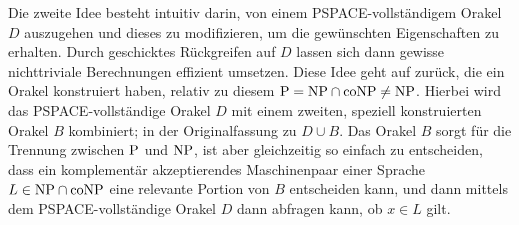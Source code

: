 Die zweite Idee besteht intuitiv darin, von einem PSPACE-vollständigem Orakel $D$ auszugehen und dieses zu modifizieren, um die gewünschten Eigenschaften zu erhalten. Durch geschicktes Rückgreifen auf $D$ lassen sich dann gewisse nichttriviale Berechnungen effizient umsetzen. Diese Idee geht auf \textcite{baker_relativizations_1975} zurück, die ein Orakel konstruiert haben, relativ zu diesem $\P=\NP\cap\coNP\neq\NP$. Hierbei wird das PSPACE-vollständige Orakel $D$ mit einem zweiten, speziell konstruierten Orakel $B$ kombiniert; in der Originalfassung zu $D\cup B$. Das Orakel $B$ sorgt für die Trennung zwischen $\P$ und $\NP$, ist aber gleichzeitig so einfach zu entscheiden, dass ein komplementär akzeptierendes Maschinenpaar einer Sprache $L\in\NP\cap\coNP$ eine relevante Portion von $B$ entscheiden kann, und dann mittels dem PSPACE-vollständige Orakel $D$ dann abfragen kann, ob $x\in L$ gilt.

